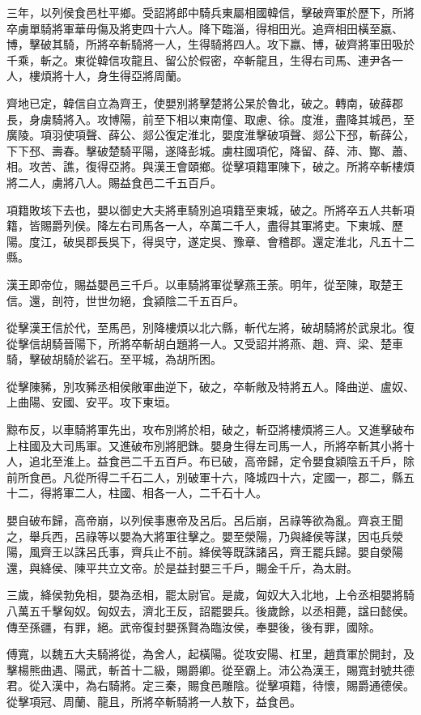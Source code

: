 \begin{pinyinscope}
三年，以列侯食邑杜平鄉。受詔將郎中騎兵東屬相國韓信，擊破齊軍於歷下，所將卒虜單騎將軍華毋傷及將吏四十六人。降下臨淄，得相田光。追齊相田橫至嬴、博，擊破其騎，所將卒斬騎將一人，生得騎將四人。攻下嬴、博，破齊將軍田吸於千乘，斬之。東從韓信攻龍且、留公於假密，卒斬龍且，生得右司馬、連尹各一人，樓煩將十人，身生得亞將周蘭。

齊地已定，韓信自立為齊王，使嬰別將擊楚將公杲於魯北，破之。轉南，破薛郡長，身虜騎將入。攻博陽，前至下相以東南僮、取慮、徐。度淮，盡降其城邑，至廣陵。項羽使項聲、薛公、郯公復定淮北，嬰度淮擊破項聲、郯公下邳，斬薛公，下下邳、壽春。擊破楚騎平陽，遂降彭城。虜柱國項佗，降留、薛、沛、酇、蕭、相。攻苦、譙，復得亞將。與漢王會頤鄉。從擊項籍軍陳下，破之。所將卒斬樓煩將二人，虜將八人。賜益食邑二千五百戶。

項籍敗垓下去也，嬰以御史大夫將車騎別追項籍至東城，破之。所將卒五人共斬項籍，皆賜爵列侯。降左右司馬各一人，卒萬二千人，盡得其軍將吏。下東城、歷陽。度江，破吳郡長吳下，得吳守，遂定吳、豫章、會稽郡。還定淮北，凡五十二縣。

漢王即帝位，賜益嬰邑三千戶。以車騎將軍從擊燕王荼。明年，從至陳，取楚王信。還，剖符，世世勿絕，食潁陰二千五百戶。

從擊漢王信於代，至馬邑，別降樓煩以北六縣，斬代左將，破胡騎將於武泉北。復從擊信胡騎晉陽下，所將卒斬胡白題將一人。又受詔并將燕、趙、齊、梁、楚車騎，擊破胡騎於硰石。至平城，為胡所困。

從擊陳豨，別攻豨丞相侯敞軍曲逆下，破之，卒斬敞及特將五人。降曲逆、盧奴、上曲陽、安國、安平。攻下東垣。

黥布反，以車騎將軍先出，攻布別將於相，破之，斬亞將樓煩將三人。又進擊破布上柱國及大司馬軍。又進破布別將肥銖。嬰身生得左司馬一人，所將卒斬其小將十人，追北至淮上。益食邑二千五百戶。布已破，高帝歸，定令嬰食潁陰五千戶，除前所食邑。凡從所得二千石二人，別破軍十六，降城四十六，定國一，郡二，縣五十二，得將軍二人，柱國、相各一人，二千石十人。

嬰自破布歸，高帝崩，以列侯事惠帝及呂后。呂后崩，呂祿等欲為亂。齊哀王聞之，舉兵西，呂祿等以嬰為大將軍往擊之。嬰至滎陽，乃與絳侯等謀，因屯兵滎陽，風齊王以誅呂氏事，齊兵止不前。絳侯等既誅諸呂，齊王罷兵歸。嬰自滎陽還，與絳侯、陳平共立文帝。於是益封嬰三千戶，賜金千斤，為太尉。

三歲，絳侯勃免相，嬰為丞相，罷太尉官。是歲，匈奴大入北地，上令丞相嬰將騎八萬五千擊匈奴。匈奴去，濟北王反，詔罷嬰兵。後歲餘，以丞相薨，諡曰懿侯。傳至孫疆，有罪，絕。武帝復封嬰孫賢為臨汝侯，奉嬰後，後有罪，國除。

傅寬，以魏五大夫騎將從，為舍人，起橫陽。從攻安陽、杠里，趙賁軍於開封，及擊楊熊曲遇、陽武，斬首十二級，賜爵卿。從至霸上。沛公為漢王，賜寬封號共德君。從入漢中，為右騎將。定三秦，賜食邑雕陰。從擊項籍，待懷，賜爵通德侯。從擊項冠、周蘭、龍且，所將卒斬騎將一人敖下，益食邑。


\end{pinyinscope}
